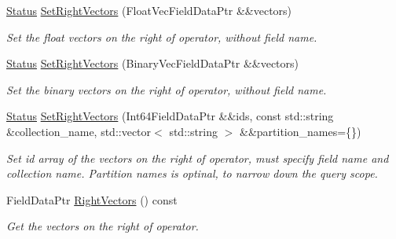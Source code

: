 \begin{DoxyCompactItemize}
\mbox{\label{classmilvus_1_1_calc_distance_arguments_a6f6261ea0a295c1e8700624e00fc206a}} 
\hyperlink{classmilvus_1_1_status}{Status} \hyperlink{classmilvus_1_1_calc_distance_arguments_a6f6261ea0a295c1e8700624e00fc206a}{Set\+Right\+Vectors} (Float\+Vec\+Field\+Data\+Ptr \&\&vectors)
\begin{DoxyCompactList}\small\item\em Set the float vectors on the right of operator, without field name. \end{DoxyCompactList}\item 
\mbox{\label{classmilvus_1_1_calc_distance_arguments_a87342315cb662b50302b9940601b5f22}} 
\hyperlink{classmilvus_1_1_status}{Status} \hyperlink{classmilvus_1_1_calc_distance_arguments_a87342315cb662b50302b9940601b5f22}{Set\+Right\+Vectors} (Binary\+Vec\+Field\+Data\+Ptr \&\&vectors)
\begin{DoxyCompactList}\small\item\em Set the binary vectors on the right of operator, without field name. \end{DoxyCompactList}\item 
\mbox{\label{classmilvus_1_1_calc_distance_arguments_aba56914db49d14fc4a63399e37d86b41}} 
\hyperlink{classmilvus_1_1_status}{Status} \hyperlink{classmilvus_1_1_calc_distance_arguments_aba56914db49d14fc4a63399e37d86b41}{Set\+Right\+Vectors} (Int64\+Field\+Data\+Ptr \&\&ids, const std\+::string \&collection\+\_\+name, std\+::vector$<$ std\+::string $>$ \&\&partition\+\_\+names=\{\})
\begin{DoxyCompactList}\small\item\em Set id array of the vectors on the right of operator, must specify field name and collection name. Partition names is optinal, to narrow down the query scope. \end{DoxyCompactList}\item 
\mbox{\label{classmilvus_1_1_calc_distance_arguments_aa2d7b3c97b9107ae44c9173b1e10ef83}} 
Field\+Data\+Ptr \hyperlink{classmilvus_1_1_calc_distance_arguments_aa2d7b3c97b9107ae44c9173b1e10ef83}{Right\+Vectors} () const
\begin{DoxyCompactList}\small\item\em Get the vectors on the right of operator. \end{DoxyCompactList}\item 

\end{DoxyCompactItemize}
